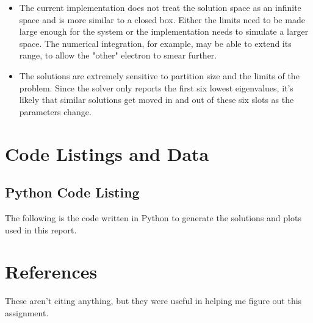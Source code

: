 \documentclass[10pt, oneside, letterpaper]{article}
\begin{document}
\begin{itemize}
    \item The current implementation does not treat the solution space as an infinite space and is more similar to a closed box. Either the limits need to be made large enough for the system or the implementation needs to simulate a larger space. The numerical integration, for example, may be able to extend its range, to allow the "other" electron to smear further.
    \item The solutions are extremely sensitive to partition size and the limits of the problem. Since the solver only reports the first six lowest eigenvalues, it's likely that similar solutions get moved in and out of these six slots as the parameters change.
\end{itemize}

\newpage
\section{Code Listings and Data}

\subsection{Python Code Listing}
\label{code-listing-python}
The following is the code written in Python to generate the solutions and plots used in this report.


\newpage
\section{References}

These aren't citing anything, but they were useful in helping me figure out this assignment.
\end{document}
